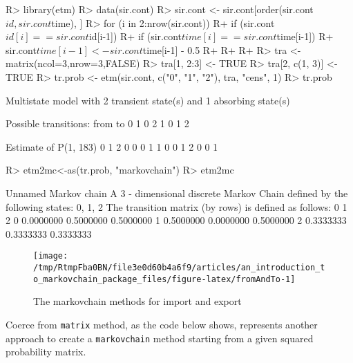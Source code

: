 \documentclass[
  nojss]{jss}
\begin{document}
\begin{CodeChunk}

\begin{CodeInput}
R> library(etm)
R> data(sir.cont)
R> sir.cont <- sir.cont[order(sir.cont$id, sir.cont$time), ]
R> for (i in 2:nrow(sir.cont)) {
R+   if (sir.cont$id[i]==sir.cont$id[i-1]) {
R+     if (sir.cont$time[i]==sir.cont$time[i-1]) {
R+       sir.cont$time[i-1] <- sir.cont$time[i-1] - 0.5
R+     }
R+   }
R+ }
R> tra <- matrix(ncol=3,nrow=3,FALSE)
R> tra[1, 2:3] <- TRUE
R> tra[2, c(1, 3)] <- TRUE
R> tr.prob <- etm(sir.cont, c("0", "1", "2"), tra, "cens", 1)
R> tr.prob
\end{CodeInput}

\begin{CodeOutput}
Multistate model with 2 transient state(s)
 and 1 absorbing state(s)

Possible transitions:
 from to
    0  1
    0  2
    1  0
    1  2

Estimate of P(1, 183)
  0 1 2
0 0 0 1
1 0 0 1
2 0 0 1
\end{CodeOutput}

\begin{CodeInput}
R> etm2mc<-as(tr.prob, "markovchain")
R> etm2mc
\end{CodeInput}

\begin{CodeOutput}
Unnamed Markov chain 
 A  3 - dimensional discrete Markov Chain defined by the following states: 
 0, 1, 2 
 The transition matrix  (by rows)  is defined as follows: 
          0         1         2
0 0.0000000 0.5000000 0.5000000
1 0.5000000 0.0000000 0.5000000
2 0.3333333 0.3333333 0.3333333
\end{CodeOutput}
\end{CodeChunk}

\begin{CodeChunk}
\begin{figure}

{\centering \texttt{[image: /tmp/RtmpFba0BN/file3e0d60b4a6f9/articles/an\_introduction\_to\_markovchain\_package\_files/figure-latex/fromAndTo-1]} 

}

\caption[The markovchain methods for import and export]{The markovchain methods for import and export}\label{fig:fromAndTo}
\end{figure}
\end{CodeChunk}

Coerce from \texttt{matrix} method, as the code below shows, represents another approach to create a \texttt{markovchain} method starting from a given squared probability matrix.
\end{document}
